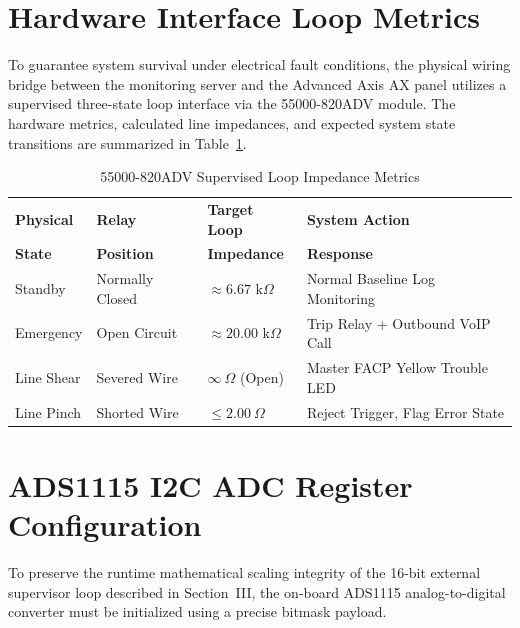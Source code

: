 
\section{Hardware Interface Loop Metrics}
To guarantee system survival under electrical fault conditions, the physical wiring bridge between the monitoring server and the Advanced Axis AX panel utilizes a supervised three-state loop interface via the 55000-820ADV module. The hardware metrics, calculated line impedances, and expected system state transitions are summarized in Table~\ref{tab:ieee_loop_specs}.

\begin{table}[htbp]
    \centering
    \footnotesize
    \caption{55000-820ADV Supervised Loop Impedance Metrics}
    \label{tab:ieee_loop_specs}
    \setlength{\tabcolsep}{3pt}
    \begin{tabular}{l p{1.6cm} l p{2.4cm}}
        \toprule
        \textbf{Physical} & \textbf{Relay} & \textbf{Target Loop} & \textbf{System Action} \\
        \textbf{State} & \textbf{Position} & \textbf{Impedance} & \textbf{Response} \\
        \midrule
        Standby & Normally Closed & $\approx 6.67\text{ k}\Omega$ & Normal Baseline Log Monitoring \\
        \addlinespace[2pt]
        Emergency & Open Circuit & $\approx 20.00\text{ k}\Omega$ & Trip Relay + Outbound VoIP Call \\
        \addlinespace[2pt]
        Line Shear & Severed Wire & $\infty\ \Omega$ (Open) & Master FACP Yellow Trouble LED \\
        \addlinespace[2pt]
        Line Pinch & Shorted Wire & $\le 2.00\ \Omega$ & Reject Trigger, Flag Error State \\
        \bottomrule
    \end{tabular}
\end{table}

\appendices

\section{ADS1115 I2C ADC Register Configuration}
\label{app:ads1115_config}
To preserve the runtime mathematical scaling integrity of the 16-bit external supervisor loop described in Section~III, the on-board ADS1115 analog-to-digital converter must be initialized using a precise bitmask payload. 

